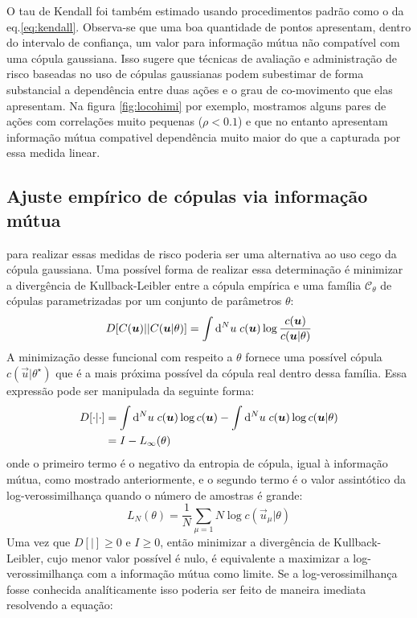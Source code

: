  O tau de Kendall foi também estimado usando procedimentos padrão como o da eq.\eqref{eq:kendall}. Observa-se que uma boa quantidade de pontos apresentam, dentro do intervalo de confiança, um valor para informação mútua não compatível com uma cópula gaussiana. Isso sugere que técnicas de avaliação e administração de risco baseadas no uso de cópulas gaussianas podem subestimar de forma substancial a dependência entre duas ações e o grau de co-movimento que elas apresentam. Na figura \ref{fig:locohimi} por exemplo, mostramos alguns pares de ações com correlações muito pequenas ($\rho < 0.1$) e que no entanto apresentam informação mútua compativel dependência muito maior do que a capturada por essa medida linear. 

\subsection{Ajuste empírico de cópulas via informação mútua}
\label{sec:ajuste}
 para realizar essas medidas de risco poderia ser uma alternativa ao uso cego da cópula gaussiana. Uma possível forma de realizar essa determinação é minimizar a divergência de Kullback-Leibler entre a cópula empírica e uma família $\mathcal{C}_\theta$ de cópulas parametrizadas por um conjunto de parâmetros $\theta$:
\begin{equation}
 D[C(\bm{u}) || C(\bm{u} | \theta)] = \int \mathrm{d}^N u \; c(\bm{u}) \log \frac{c(\bm{u})}{c(\bm{u}|\theta)}
\end{equation}
A minimização desse funcional com respeito a $\theta$ fornece uma possível cópula $c(\vec{u}|\theta^{\star})$ que é a mais próxima possível da cópula real dentro dessa família. Essa expressão pode ser manipulada da seguinte forma:
\begin{align}
D[\cdot|\cdot] &= \int \mathrm{d}^N u \; c(\bm{u}) \log c(\bm{u}) - \int \mathrm{d}^N u \; c(\bm{u}) \log c(\bm{u} | \theta) \\
&= I - L_{\infty}(\theta) 
\end{align}
onde o primeiro termo é o negativo da entropia de cópula, igual à informação mútua, como mostrado anteriormente, e o segundo termo é o valor assintótico da log-verossimilhança quando o número de amostras é grande:
\[
 L_{N}(\theta) = \frac{1}{N} \sum_{\mu=1}{N} \log c(\vec{u}_{\mu} | \theta)
\]
Uma vez que $D[|]\ge 0$ e $I \ge 0$, então minimizar a divergência de Kullback-Leibler, cujo menor valor possível é nulo, é equivalente a maximizar a log-verossimilhança com a informação mútua como limite. Se a log-verossimilhança fosse conhecida analíticamente isso poderia ser feito de maneira imediata resolvendo a equação:
